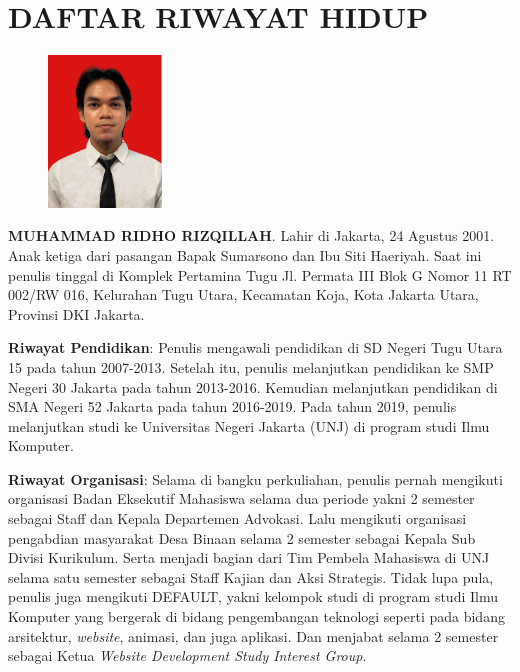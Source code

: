 \pagestyle{empty}
\chapter*{\centering \large DAFTAR RIWAYAT HIDUP}
\thispagestyle{empty}
\onehalfspacing{}

\begin{figure}
	\vspace{-25pt}
	\begin{center}
		\includegraphics[width=0.27\textwidth]{gambar/pas_foto/ridho}
	\end{center}
	\vspace{-40pt}
\end{figure}

\noindent \textbf{MUHAMMAD RIDHO RIZQILLAH}. Lahir di Jakarta, 24 Agustus 2001. Anak ketiga dari pasangan Bapak Sumarsono dan Ibu Siti Haeriyah. Saat ini penulis tinggal di Komplek Pertamina Tugu Jl. Permata III Blok G Nomor 11 RT 002/RW 016, Kelurahan Tugu Utara, Kecamatan Koja, Kota Jakarta Utara, Provinsi DKI Jakarta.

\vspace{2.5cm}

\noindent \textbf{Riwayat Pendidikan}: Penulis mengawali pendidikan di SD Negeri Tugu Utara 15 pada tahun 2007-2013. Setelah itu, penulis melanjutkan pendidikan ke SMP Negeri 30 Jakarta pada tahun 2013-2016. Kemudian melanjutkan pendidikan di SMA Negeri 52 Jakarta pada tahun 2016-2019. Pada tahun 2019, penulis melanjutkan studi ke Universitas Negeri Jakarta (UNJ) di program studi Ilmu Komputer.
\vspace{0.5cm}

\noindent \textbf{Riwayat Organisasi}: Selama di bangku perkuliahan, penulis pernah mengikuti organisasi Badan Eksekutif Mahasiswa selama dua periode yakni 2 semester sebagai Staff dan Kepala Departemen Advokasi. Lalu mengikuti organisasi pengabdian masyarakat Desa Binaan selama 2 semester sebagai Kepala Sub Divisi Kurikulum. Serta menjadi bagian dari Tim Pembela Mahasiswa di UNJ selama satu semester sebagai Staff Kajian dan Aksi Strategis. Tidak lupa pula, penulis juga mengikuti DEFAULT, yakni kelompok studi di program studi Ilmu Komputer yang bergerak di bidang pengembangan teknologi seperti pada bidang arsitektur, \emph{website}, animasi, dan juga aplikasi. Dan menjabat selama 2 semester sebagai Ketua \emph{Website Development Study Interest Group}.